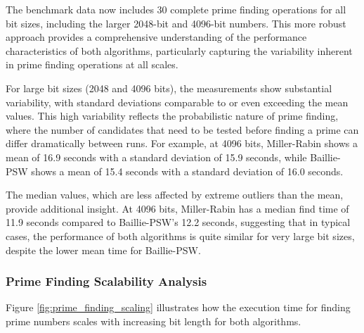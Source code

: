 The benchmark data now includes 30 complete prime finding operations for all bit sizes, including the larger 2048-bit and 4096-bit numbers. This more robust approach provides a comprehensive understanding of the performance characteristics of both algorithms, particularly capturing the variability inherent in prime finding operations at all scales.

For large bit sizes (2048 and 4096 bits), the measurements show substantial variability, with standard deviations comparable to or even exceeding the mean values. This high variability reflects the probabilistic nature of prime finding, where the number of candidates that need to be tested before finding a prime can differ dramatically between runs. For example, at 4096 bits, Miller-Rabin shows a mean of 16.9 seconds with a standard deviation of 15.9 seconds, while Baillie-PSW shows a mean of 15.4 seconds with a standard deviation of 16.0 seconds.

The median values, which are less affected by extreme outliers than the mean, provide additional insight. At 4096 bits, Miller-Rabin has a median find time of 11.9 seconds compared to Baillie-PSW's 12.2 seconds, suggesting that in typical cases, the performance of both algorithms is quite similar for very large bit sizes, despite the lower mean time for Baillie-PSW.

\subsubsection{Prime Finding Scalability Analysis}

Figure \ref{fig:prime_finding_scaling} illustrates how the execution time for finding prime numbers scales with increasing bit length for both algorithms.


